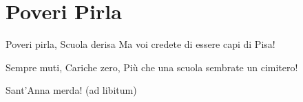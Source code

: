 \section{Poveri Pirla}
\begin{canzone}
Poveri pirla,
Scuola derisa
Ma voi credete di essere capi di Pisa!

Sempre muti,
Cariche zero,
Più che una scuola sembrate un cimitero!

Sant'Anna merda! (ad libitum)
\end{canzone}
